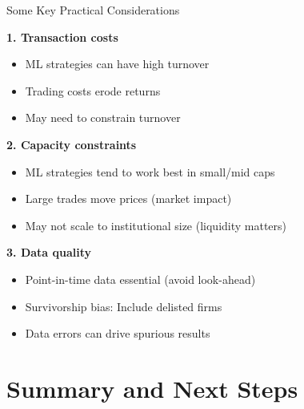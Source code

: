 \documentclass[10pt]{beamer}
\newcommand{\highlightred}[1]{\textcolor{AccentRed}{\textbf{#1}}}
\begin{document}
\begin{frame}{Some Key Practical Considerations}

\textbf{1. \highlightred{Transaction costs}}
\begin{itemize}
  \item ML strategies can have high turnover
  \item Trading costs erode returns
  \item May need to constrain turnover
\end{itemize}

\vspace{0.5em}
\textbf{2. \highlightred{Capacity constraints}}
\begin{itemize}
  \item ML strategies tend to work best in small/mid caps
  \item Large trades move prices (market impact)
  \item May not scale to institutional size (liquidity matters)
\end{itemize}

\vspace{0.5em}
\textbf{3. Data quality}
\begin{itemize}
  \item Point-in-time data essential (avoid look-ahead)
  \item Survivorship bias: Include delisted firms
  \item Data errors can drive spurious results
\end{itemize}

\end{frame}



\section{Summary and Next Steps}
\end{document}
